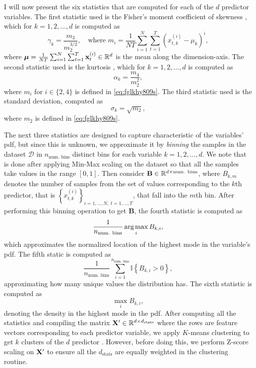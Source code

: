 \documentclass{statsmsc}
\begin{document}
{I will now present the six statistics that are computed
for each of the $d$ predictor variables.
The first statistic used is the Fisher's moment
coefficient of skewness \citep{shape}, which for $k=1,2,\dots,d$ is computed as
\begin{equation}\label{eq:fglkhy809s}
    \gamma_k=\frac{m_3}{m_2^{3/2}}, \quad \textrm{where }
    m_i=  \frac{1}{NT} \sum^{N}_{i=1} \sum^{T}_{t=1} \left(x^{(i)}_{t,k}-\mu_k \right)^i,
\end{equation}
where $\bm{\mu}=\frac{1}{NT}\sum^{N}_{i=1} \sum^{T}_{t=1} \mathbf{x}^{(i)}_t \in \mathbb{R}^d$ is the mean along the dimension-axis.
The second statistic used is the kurtosis \citep{shape}, which for $k=1,2,\dots,d$ is computed as
\begin{equation}
    \alpha_k=\frac{m_4}{m_2^2},
\end{equation}
where $m_i$ for $i\in \{2,4\}$ is defined in  \cref{eq:fglkhy809s}.
The third statistic used is the standard deviation, computed as
\begin{equation}
    \sigma_k=\sqrt{m_2},
\end{equation}
where $m_2$ is defined in \cref{eq:fglkhy809s}.

The next three statistics are designed to capture characteristic of the variables' \ac{pdf}, but
since this is unknown, we approximate it by \textit{binning} the samples in the dataset
$\mathcal{D}$ in $n_{\textrm{num. bins}}$ distinct bins for each variable $k=1,2,\dots,d$.
We note that is done after applying Min-Max scaling on the dataset so that all the samples take
values in the range $[0,1]$.
Then consider $\mathbf{B} \in \mathbb{R}^{d \times \textrm{num. bins}}$,
where $B_{k,m}$ denotes the number of samples from the set of values corresponding to the
$k$th predictor, that is $\left\{x_{t,k}^{(i)} \right\}_{i=1,\dots,N,\;t=1,\dots,T}$,
that fall into the $m$th bin.
After performing this binning operation to get $\mathbf{B}$, the fourth statistic is computed as
\begin{equation}
    \frac{1}{n_{\textrm{num. bins} }}  \operatorname*{arg\,max}_{i} B_{k,i},
\end{equation}
which approximates the normalized location of the highest mode in the variable's \ac{pdf}.
The fifth static is computed as
\begin{equation}
    \frac{1}{n_{\textrm{num. bins} }}  \sum^{n_{\textrm{num. bins} }}_{i=1} \mathbb{I}\left\{
        B_{k,i} > 0
    \right\},
\end{equation}
approximating how many unique values the distribution has. The sixth statistic is computed as
\begin{equation}
     \max_{i} B_{k,i},
\end{equation}
denoting the density in the highest mode in the \ac{pdf}.
After computing all the statistics and compiling the matrix
$\mathbf{X}' \in \mathbb{R}^{d \times d_{\textrm{stats} }}$ where the rows are feature vectors corresponding
to each predictor variable, we apply $K$-means clustering to get $k$ clusters
of the $d$ predictor \citep{kmeans}. However, before doing this, we perform Z-score scaling
on $\mathbf{X}'$ to ensure all the $d_{\textrm{stats}}$ are equally weighted in the clustering
routine.

}
\end{document}
